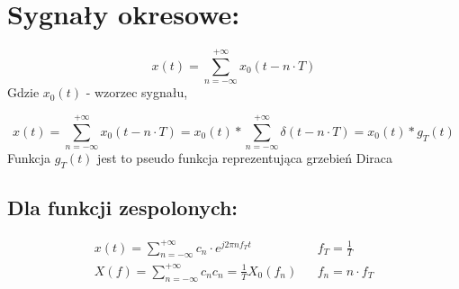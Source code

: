 \section{Sygnały okresowe:}
    \begin{equation*}
        x(t) = \sum_{n = -\infty}^{+\infty}x_0(t-n\cdot T)
    \end{equation*}
    Gdzie $x_0(t)$ - wzorzec sygnału,

    \begin{equation*}
        x(t) = \sum_{n=-\infty}^{+\infty}x_0(t-n\cdot T) = x_0(t) * \sum_{n=-\infty}^{+\infty}\delta(t-n\cdot T) = x_0(t)*g_T(t)
    \end{equation*}
    Funkcja $g_T(t)$ jest to pseudo funkcja reprezentująca grzebień Diraca

    \subsection*{Dla funkcji zespolonych:}
        \begin{align*}
            x(t) = \sum_{n=-\infty}^{+\infty} c_n \cdot e^{j2\pi n f_T t} && f_T = \frac{1}{T}\\
            X(f) = \sum_{n=-\infty}^{+\infty} c_n 
            c_n = \frac{1}{T} X_0(f_n) && f_n = n\cdot f_T
        \end{align*}